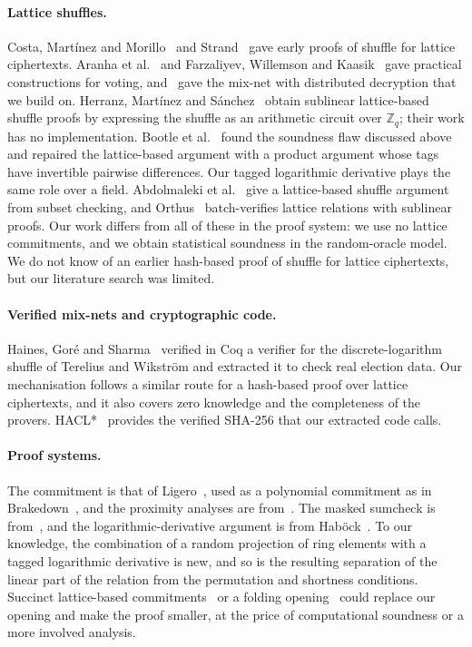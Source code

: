 \documentclass[sigconf,anonymous]{acmart}
\newcommand{\Zq}{\mathbb{Z}_q}
\begin{document}
\paragraph{Lattice shuffles.}
Costa, Mart\'inez and Morillo~\cite{CMM19} and Strand~\cite{Strand18} gave early proofs of shuffle
for lattice ciphertexts. Aranha et al.~\cite{ABGSctrsa21} and Farzaliyev, Willemson and
Kaasik~\cite{FWK21} gave practical constructions for voting, and~\cite{ABGS23} gave the mix-net with
distributed decryption that we build on. Herranz, Mart\'inez and S\'anchez~\cite{HMS21} obtain
sublinear lattice-based shuffle proofs by expressing the shuffle as an arithmetic circuit over $\Zq$;
their work has no implementation. Bootle et al.~\cite{BLM25} found the soundness flaw discussed above
and repaired the lattice-based argument with a product argument whose tags have invertible pairwise
differences. Our tagged logarithmic derivative plays the same role over a field. Abdolmaleki et
al.~\cite{AbdShuffle} give a lattice-based shuffle argument from subset checking, and
Orthus~\cite{Orthus} batch-verifies lattice relations with sublinear proofs. Our work differs from all
of these in the proof system: we use no lattice commitments, and we obtain statistical soundness in
the random-oracle model. We do not know of an earlier hash-based proof of shuffle for lattice
ciphertexts, but our literature search was limited.

\paragraph{Verified mix-nets and cryptographic code.}
Haines, Gor\'e and Sharma~\cite{HGS21} verified in Coq a verifier for the discrete-logarithm shuffle
of Terelius and Wikstr\"om and extracted it to check real election data. Our mechanisation follows a
similar route for a hash-based proof over lattice ciphertexts, and it also covers zero knowledge and
the completeness of the provers. HACL*~\cite{HACL17} provides the verified SHA-256 that our extracted
code calls.

\paragraph{Proof systems.}
The commitment is that of Ligero~\cite{AHIV17}, used as a polynomial commitment as in
Brakedown~\cite{Brakedown}, and the proximity analyses are from~\cite{AHIV17,DP23,BCIKS20}. The masked
sumcheck is from~\cite{CFS17,Libra}, and the logarithmic-derivative argument is from
Hab\"ock~\cite{Hab22}. To our knowledge, the combination of a random projection of ring elements with
a tagged logarithmic derivative is new, and so is the resulting separation of the linear part of the
relation from the permutation and shortness conditions. Succinct lattice-based
commitments~\cite{LaBRADOR,NS24} or a folding opening~\cite{BaseFold} could replace our opening and
make the proof smaller, at the price of computational soundness or a more involved analysis.
\end{document}
